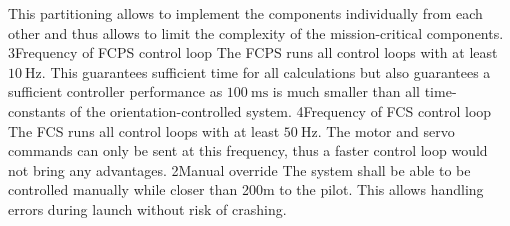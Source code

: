     {
        This partitioning allows to implement the components
        individually from each other and thus allows to limit the complexity
        of the mission-critical components.
    }
\dd
    {3}{Frequency of FCPS control loop}
    {
        The FCPS runs all control loops with at least $\SI{10}{\hertz}$.
    }
    {
        This guarantees sufficient time for all calculations but also
        guarantees a sufficient controller performance as 
        $\SI{100}{\milli\second}$ is much smaller than all time-constants
        of the orientation-controlled system.
    }
\dd
    {4}{Frequency of FCS control loop}
    {
        The FCS runs all control loops with at least $\SI{50}{\hertz}$.
    }
    {
        The motor and servo commands can only be sent at
        this frequency, thus a faster control loop would not bring
        any advantages. 
    }
\dd
    {2}{Manual override}
    {
        The system shall be able to be controlled manually
        while closer than 200m to the pilot.
    }
    {
        This allows handling errors during launch without
        risk of crashing.
    }